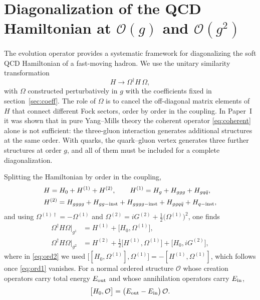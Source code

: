 \documentclass[11pt,a4paper]{article}
\numberwithin{equation}{section}
\newcommand{\dg}{\dagger}
\newcommand{\OM}{\Omega}
\newcommand{\order}[1]{\mathcal{O}(#1)}
\begin{document}
\section{Diagonalization of the QCD Hamiltonian at $\order{g}$ and $\order{g^{2}}$}
\label{sec:diag}

The evolution operator provides a systematic framework for diagonalizing the soft QCD
Hamiltonian of a fast-moving hadron. We use the unitary similarity transformation
\begin{equation}
H\to\OM^{\dg}H\,\OM ,
\label{eq:sim}
\end{equation}
with $\OM$ constructed perturbatively in $g$ with the coefficients fixed in
section~\ref{sec:coeff}. The role of $\OM$ is to cancel the off-diagonal matrix elements of $H$
that connect different Fock sectors, order by order in the coupling. In Paper~I it was shown that
in pure Yang--Mills theory the coherent operator \eqref{eq:coherent} alone is not sufficient: the
three-gluon interaction generates additional structures at the same order. With quarks, the
quark--gluon vertex generates three further structures at order $g$, and all of them must be
included for a complete diagonalization.

Splitting the Hamiltonian by order in the coupling,
\begin{align}
&H=H_{0}+H^{(1)}+H^{(2)},\qquad
H^{(1)}=H_{g}+H_{ggg}+H_{gq\bar q},
\nonumber\\
&H^{(2)}=H_{gggg}+H_{gg-{\rm inst}}+H_{gggg-{\rm inst}}+H_{ggq\bar q}+H_{q-{\rm inst}},
\label{eq:Hsplit}
\end{align}
and using $\OM^{(1)\dg}=-\OM^{(1)}$ and $\OM^{(2)}=iG^{(2)}+\tfrac12\big(\OM^{(1)}\big)^{2}$, one finds
\begin{align}
\OM^{\dg}H\OM\Big|_{g^{1}}&=H^{(1)}+\big[H_{0},\OM^{(1)}\big],
\label{eq:ord1}\\
\OM^{\dg}H\OM\Big|_{g^{2}}&=H^{(2)}+\tfrac12\big[H^{(1)},\OM^{(1)}\big]+\big[H_{0},iG^{(2)}\big],
\label{eq:ord2}
\end{align}
where in \eqref{eq:ord2} we used $\big[[H_{0},\OM^{(1)}],\OM^{(1)}\big]=-[H^{(1)},\OM^{(1)}]$, which
follows once \eqref{eq:ord1} vanishes. For a normal ordered structure $\mathcal O$ whose creation
operators carry total energy $E_{\rm out}$ and whose annihilation operators carry $E_{\rm in}$,
\begin{equation}
\big[H_{0},\mathcal O\big]=\big(E_{\rm out}-E_{\rm in}\big)\,\mathcal O .
\label{eq:H0O}
\end{equation}
\end{document}
